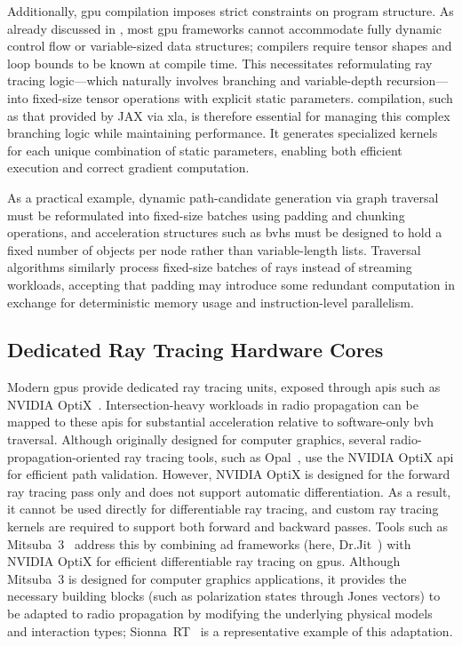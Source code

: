 Additionally, \gls{gpu} compilation imposes strict constraints on program structure. As already discussed in , most \gls{gpu} frameworks cannot accommodate fully dynamic control flow or variable-sized data structures; compilers require tensor shapes and loop bounds to be known at compile time. This necessitates reformulating ray tracing logic---which naturally involves branching and variable-depth recursion---into fixed-size tensor operations with explicit static parameters.  compilation, such as that provided by JAX via \gls{xla}, is therefore essential for managing this complex branching logic while maintaining performance. It generates specialized kernels for each unique combination of static parameters, enabling both efficient execution and correct gradient computation.

As a practical example, dynamic path-candidate generation via graph traversal must be reformulated into fixed-size batches using padding and chunking operations, and acceleration structures such as \glspl{bvh} must be designed to hold a fixed number of objects per node rather than variable-length lists. Traversal algorithms similarly process fixed-size batches of rays instead of streaming workloads, accepting that padding may introduce some redundant computation in exchange for deterministic memory usage and instruction-level parallelism.

\subsection{Dedicated Ray Tracing Hardware Cores}

Modern \glspl{gpu} provide dedicated ray tracing units, exposed through \glspl{api} such as NVIDIA OptiX~. Intersection-heavy workloads in radio propagation can be mapped to these \glspl{api} for substantial acceleration relative to software-only \gls{bvh} traversal. Although originally designed for computer graphics, several radio-propagation-oriented ray tracing tools, such as Opal~, use the NVIDIA OptiX \gls{api} for efficient path validation. However, NVIDIA OptiX is designed for the forward ray tracing pass only and does not support automatic differentiation. As a result, it cannot be used directly for differentiable ray tracing, and custom ray tracing kernels are required to support both forward and backward passes. Tools such as Mitsuba~3~ address this by combining \gls{ad} frameworks (here, Dr.Jit~) with NVIDIA OptiX for efficient differentiable ray tracing on \glspl{gpu}. Although Mitsuba~3 is designed for computer graphics applications, it provides the necessary building blocks (such as polarization states through Jones vectors) to be adapted to radio propagation by modifying the underlying physical models and interaction types; Sionna~RT~ is a representative example of this adaptation.

